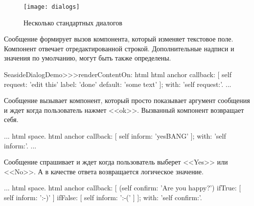 \documentclass[a4paper,10pt,twoside]{book}
\begin{document}
\begin{figure}[b]
\begin{center}
\texttt{[image: dialogs]}
\caption{Несколько стандартных диалогов}
\end{center}
\end{figure}


Сообщение  формирует вызов
компонента, который изменяет текстовое поле.
Компонент отвечает отредактированной строкой.
Дополнительные надписи и значения по умолчанию,
могут быть также определены.

\begin{code}{}
SeasideDialogDemo>>>renderContentOn: html
	html anchor
		callback: [ self request: 'edit this' label: 'done' default: 'some text' ];
		with: 'self request:'.
...
\end{code}


Сообщение  вызывает компонент,
который просто показывает аргумент сообщения и ждет когда пользователь
нажмет <<ok>>.
Вызванный компонент возвращает себя.

\begin{code}{}
...
	html space.
	html anchor
		callback: [ self inform: 'yesBANG' ];
		with: 'self inform:'.
...
\end{code}


Сообщение  спрашивает и ждет когда
пользователь выберет <<Yes>> или <<No>>.
А в качестве ответа возвращается логическое значение.

\begin{code}{}
...
	html space.
	html anchor
		callback: [
			(self confirm: 'Are you happy?')
				ifTrue: [ self inform: ':-)' ]
				ifFalse: [ self inform: ':-(' ]
			];
		with: 'self confirm:'.
\end{code}
\end{document}
